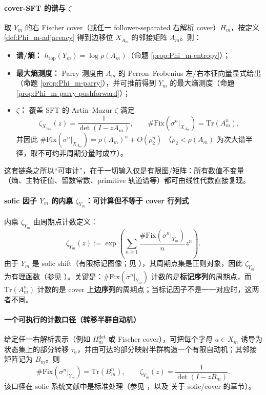 \paragraph{cover-SFT 的谱与 \texorpdfstring{$\zeta$}{zeta}}
取 \(Y_m\) 的右 Fischer cover（或任一 follower-separated 右解析 cover）\(H_m\)，按定义 \ref{def:Phi_m-adjacency} 得到边移位 \(X_{A_m}\) 的邻接矩阵 \(A_m\)。则：
\begin{itemize}
  \item \textbf{谱/熵：} \(h_{\mathrm{top}}(Y_m)=\log\rho(A_m)\)（命题 \ref{prop:Phi_m-entropy}）；
  \item \textbf{最大熵测度：} Parry 测度由 \(A_m\) 的 Perron--Frobenius 左/右本征向量显式给出（命题 \ref{prop:Phi_m-parry}），并可推前得到 \(Y_m\) 的最大熵测度（命题 \ref{prop:Phi_m-parry-pushforward}）；
  \item \textbf{\(\zeta\)：} 覆盖 SFT 的 Artin--Mazur \(\zeta\) 满足
  \[
  \zeta_{X_{A_m}}(z)=\frac{1}{\det(I-zA_m)},
  \qquad
  \#\mathrm{Fix}(\sigma^n|_{X_{A_m}})=\mathrm{Tr}(A_m^n),
  \]
  并因此
  \(
  \#\mathrm{Fix}(\sigma^n|_{X_{A_m}})=\rho(A_m)^n+O(\rho_2^n)
  \)
  （\(\rho_2<\rho(A_m)\) 为次大谱半径，取不可约非周期分量时成立）。
\end{itemize}
这套链条之所以“可审计”，在于一切输入仅是有限图/矩阵：所有数值不变量（熵、主特征值、留数常数、primitive 轨道谱等）都可由线性代数直接复现。

\paragraph{sofic 因子 \texorpdfstring{$Y_m$}{Ym} 的内禀 \texorpdfstring{$\zeta_{Y_m}$}{zetaYm}：可计算但不等于 cover 行列式}
内禀 \(\zeta_{Y_m}\) 由周期点计数定义：
\[
\zeta_{Y_m}(z):=\exp\left(\sum_{n\ge 1}\frac{\#\mathrm{Fix}(\sigma^n|_{Y_m})}{n}z^n\right).
\]
由于 \(Y_m\) 是 sofic shift（有限标记图像；见 \cite{Weiss1973SFTandSofic,CovenPaul1975SoficSystems,LindMarcus1995,Kitchens1998SymbolicDynamics}），其周期点集是正则对象，因此 \(\zeta_{Y_m}\) 为有理函数（参见 \cite{Manning1971RationalZeta}）。关键是：\(\#\mathrm{Fix}(\sigma^n|_{Y_m})\) 计数的是\textbf{标记序列}的周期点，而 \(\mathrm{Tr}(A_m^n)\) 计数的是 cover 上\textbf{边序列}的周期点；当标记因子不是一一对应时，这两者不同。

\paragraph{一个可执行的计数口径（转移半群自动机）}
给定任一右解析表示（例如 $H_m^{\mathrm{det}}$ 或 Fischer cover），可把每个字母 $a\in X_m$ 诱导为状态集上的部分转移 $\tau_a$，并由可达的部分映射半群构造一个有限自动机；其邻接矩阵记为 $B_m$。则
\[
\#\mathrm{Fix}(\sigma^n|_{Y_m})=\mathrm{Tr}(B_m^n),\qquad
\zeta_{Y_m}(z)=\frac{1}{\det(I-zB_m)}.
\]
该口径在 sofic 系统文献中是标准处理（参见 \cite{Nasu1995TextileSystems}，以及 \cite{LindMarcus1995,Kitchens1998SymbolicDynamics} 关于 sofic/cover 的章节）。


